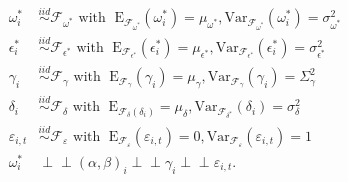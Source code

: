 \documentclass[11pt]{article}
\newcommand{\simiid}{\stackrel{iid}{\sim}} %
\newcommand{\indep}{\perp \!\!\! \perp } %
\def\mrm#1{\mathrm{#1}} %
\def\mc#1{\mathcal{#1}} %
\def\mc#1{\mathcal{#1}}
\theoremstyle{definition}
\begin{document}
\begin{align*}
\omega^{*}_i &\simiid \mc{F}_{\omega^{*}} \text{ with }  \; \mrm{E}_{\mc{F}_{\omega^{*}}}(\omega^{*}_i) = \mu_{\omega^{*}}, \mrm{Var}_{\mc{F}_{\omega^{*}}}(\omega^{*}_i)  = \sigma^2_{\omega^{*}}  \\
\epsilon^{*}_i &\simiid \mc{F}_{\epsilon^{*}} \text{ with }  \; \mrm{E}_{\mc{F}_{\epsilon^{*}}}(\epsilon^{*}_i) = \mu_{\epsilon^{*}}, \mrm{Var}_{\mc{F}_{\epsilon^{*}}}(\epsilon^{*}_i)  = \sigma^2_{\epsilon^{*}}  \\
   \gamma_i &\simiid \mc{F}_{\gamma} \text{ with }  \; \mrm{E}_{\mc{F}_{\gamma}}(\gamma_i) = \mu_{\gamma}, \mrm{Var}_{\mc{F}_{\gamma}}(\gamma_i)  = \Sigma^2_{\gamma} \\
\delta_i &\simiid \mc{F}_{\delta} \text{ with }  \; \mrm{E}_{\mc{F}_{\delta}(\delta_i)} = \mu_{\delta}, \mrm{Var}_{\mc{F}_{\delta^{*}}}(\delta_i)  = \sigma^{2}_{\delta} \\
\varepsilon_{i,t} & \simiid  \mc{F}_{\varepsilon} \text{ with }  \; \mrm{E}_{\mc{F}_{\varepsilon}}(\varepsilon_{i,t}) = 0, \mrm{Var}_{\mc{F}_{\varepsilon}}(\varepsilon_{i,t})  = 1 \\
\omega^{*}_i &\indep  (\alpha, \beta)_i \indep \gamma_i \indep \varepsilon_{i,t}.
\end{align*}
\end{document}
